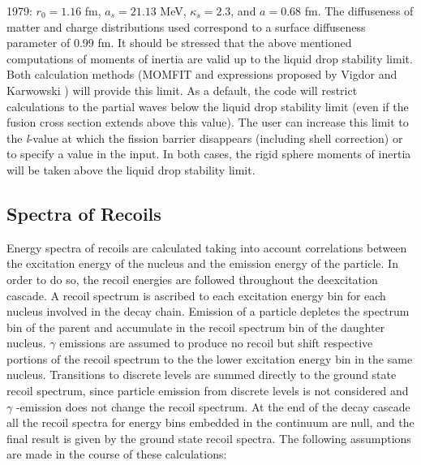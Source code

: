 1979: $r_{0}=1.16$ fm, $a_{s}=21.13$ MeV, $\kappa_{s}=2.3$, and $a=0.68$ fm.
The diffuseness of matter and charge distributions used correspond to a
surface diffuseness parameter of 0.99 fm. It should be stressed that the
above mentioned computations of moments of inertia are valid up to the
liquid drop stability limit. Both calculation methods (MOMFIT and
expressions proposed by Vigdor and Karwowski \cite{VK}) will provide this
limit. As a default, the code will restrict calculations to the partial
waves below the liquid drop stability limit (even if the fusion cross
section extends above this value). The user can increase this limit to the
\emph{l}-value at which the fission barrier disappears (including shell
correction) or to specify a value in the input. In both cases, the rigid
sphere moments of inertia will be taken above the liquid drop stability
limit.

\subsection{Spectra of Recoils}

Energy spectra of recoils are calculated taking into account correlations
between the excitation energy of the nucleus and the emission energy of the
particle. In order to do so, the recoil energies are followed throughout the
deexcitation cascade. A recoil spectrum is ascribed to each excitation
energy bin for each nucleus involved in the decay chain. Emission of a
particle depletes the spectrum bin of the parent and accumulate in the
recoil spectrum bin of the daughter nucleus. $\gamma$ emissions are assumed
to produce no recoil but shift respective portions of the recoil spectrum to
the the lower excitation energy bin in the same nucleus. Transitions to
discrete levels are summed directly to the ground state recoil spectrum,
since particle emission from discrete levels is not considered and $\gamma$%
-emission does not change the recoil spectrum. At the end of the decay
cascade all the recoil spectra for energy bins embedded in the continuum are
null, and the final result is given by the ground state recoil spectra. The
following assumptions are made in the course of these calculations:

